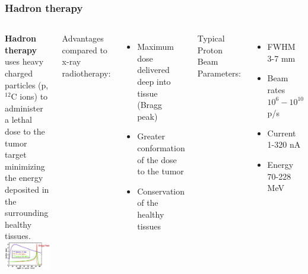 \documentclass[aspectratio=169]{beamer}
\begin{document}
	\begin{frame}
	\frametitle{Hadron therapy}
		\begin{columns}
		\begin{center}
			\textbf{Hadron therapy} uses heavy charged particles (p, ${}^{12}$C ions) to administer a lethal dose to the tumor target minimizing the energy deposited in the surrounding healthy tissues.
			\includegraphics[width=0.95 \textwidth]{IMG/Bragg_Peak.PNG}
		\end{center}
		
			{\color{blue} Advantages compared to x-ray radiotherapy:}
			\begin{itemize}
				\item Maximum dose delivered deep into tissue (Bragg peak)
				\item Greater conformation of the dose to the tumor
				\item Conservation of the healthy tissues 
			\end{itemize}
		\vspace{1 cm}
			{\color{blue} Typical Proton Beam Parameters:}
			\begin{itemize}
				\item FWHM 3-7 mm
				\item Beam rates $10^6-10^{10}$ p/s
				\item Current  1-320 nA
				\item Energy  70-228 MeV
			\end{itemize}
		
		\end{columns}
	\end{frame}
\end{document}
